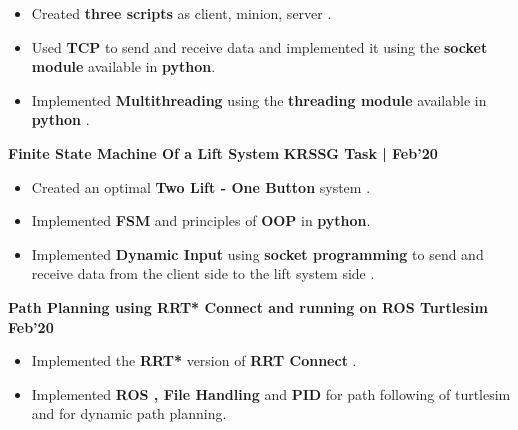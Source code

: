 \documentclass[10pt]{article}
\begin{document}
\begin{itemize}
    \item Created \textbf{three scripts} as client, minion, server .\\[-1.9em]
    \item Used \textbf{TCP} to send and receive data and implemented  it using the \textbf{socket module} available in \textbf{python}.\\[-1.9em]
    \item Implemented  \textbf{Multithreading} using the \textbf{threading module} available in \textbf{python} .\\[-1.5em]
\end{itemize}
\vspace{-0.5ex}
\large {\textbf{Finite State Machine Of a Lift System}} \normalsize  \href{https://github.com/yashica-patodia/FSM/tree/master} {\hspace{0.5ex}\faGithub} {\hfill} \textbf{ KRSSG Task | Feb'20}\\[-1.75em]
\begin{itemize}
    \item Created  an optimal \textbf{Two Lift - One Button} system .\\[-1.9em]
    \item Implemented \textbf{FSM} and principles of \textbf{OOP }  in \textbf{python}.\\[-1.9em]
    \item Implemented  \textbf{Dynamic Input} using  \textbf{socket programming} to send and receive data from the client side to the lift system side .\\[-1.5em]
\end{itemize}
\vspace{-0.5ex}
\large {\textbf{Path Planning using RRT* Connect and running on ROS Turtlesim}} \normalsize  \href{https://github.com/yashica-patodia/RRT_star/tree/master} {\hspace{0.5ex}\faGithub} {\hfill} \textbf{ Feb'20}\\[-1.75em]
\begin{itemize}
    \item Implemented the  \textbf{RRT*} version of \textbf{RRT Connect} .\\[-1.9em]
    \item Implemented \textbf{ROS , File Handling} and \textbf{PID}  for path following of turtlesim and  for dynamic path planning.\\[-1.5em]
   \end{itemize}
\vspace{-2.5ex}
\end{document}
